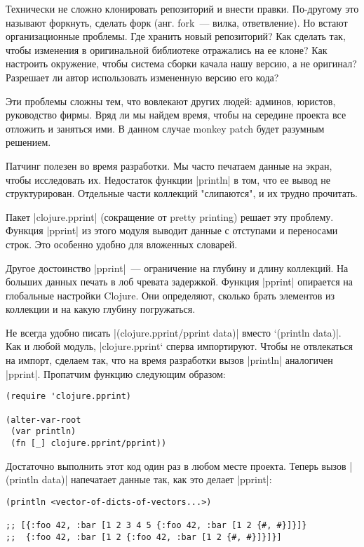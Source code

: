 Технически не сложно клонировать репозиторий и внести правки. По-другому это
называют форкнуть, сделать форк (анг. fork~--- вилка, ответвление). Но встают
организационные проблемы. Где хранить новый репозиторий? Как сделать так, чтобы
изменения в оригинальной библиотеке отражались на ее клоне? Как настроить
окружение, чтобы система сборки качала нашу версию, а не оригинал? Разрешает ли
автор использовать измененную версию его кода?

Эти проблемы сложны тем, что вовлекают других людей: админов, юристов,
руководство фирмы. Вряд ли мы найдем время, чтобы на середине проекта все
отложить и заняться ими. В данном случае monkey patch будет разумным решением.

Патчинг полезен во время разработки. Мы часто печатаем данные на экран, чтобы
исследовать их. Недостаток функции \spverb|println| в том, что ее вывод не
структурирован. Отдельные части коллекций "слипаются", и их трудно прочитать.

Пакет \spverb|clojure.pprint| (сокращение от pretty printing) решает эту
проблему. Функция \spverb|pprint| из этого модуля выводит данные с отступами и
переносами строк. Это особенно удобно для вложенных словарей.

Другое достоинство \spverb|pprint|~--- ограничение на глубину и длину коллекций. На
больших данных печать в лоб чревата задержкой. Функция \spverb|pprint| опирается на
глобальные настройки Clojure. Они определяют, сколько брать элементов из
коллекции и на какую глубину погружаться.

Не всегда удобно писать \spverb|(clojure.pprint/pprint data)| вместо `(println
data)\spverb|. Как и любой модуль, |clojure.pprint` сперва импортируют. Чтобы не
отвлекаться на импорт, сделаем так, что на время разработки вызов \spverb|println|
аналогичен \spverb|pprint|. Пропатчим функцию следующим образом:

\begin{verbatim}
(require 'clojure.pprint)

(alter-var-root
 (var println)
 (fn [_] clojure.pprint/pprint))
\end{verbatim}

Достаточно выполнить этот код один раз в любом месте проекта. Теперь вызов
\spverb|(println data)| напечатает данные так, как это делает \spverb|pprint|:

\begin{verbatim}
(println <vector-of-dicts-of-vectors...>)

;; [{:foo 42, :bar [1 2 3 4 5 {:foo 42, :bar [1 2 {#, #}]}]}
;;  {:foo 42, :bar [1 2 {:foo 42, :bar [1 2 {#, #}]}]}]
\end{verbatim}

